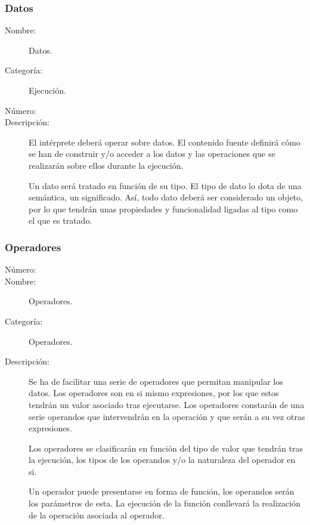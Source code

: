 \subsubsection{Datos}
\begin{framed}
	\begin{description}
		\item [Nombre:] Datos.
		\item [Categoría:] Ejecución.
		\item [Número:] \cn
		\item [Descripción:] El intérprete deberá operar sobre datos. El contenido fuente 
      definirá cómo se han de construir y/o acceder a los datos y las operaciones que se realizarán sobre ellos durante la ejecución. 
      
      Un dato será tratado en función de su tipo. El tipo de dato lo dota de una semántica, un significado.
      Así, todo dato deberá ser considerado un objeto, por lo que tendrán unas propiedades y funcionalidad ligadas al tipo como el que es tratado.
      
	\end {description}
\end{framed}

\subsubsection{Operadores}
\begin{framed}
	\begin{description}
		\item [Número:] \cn
		\item [Nombre:] Operadores.
		\item [Categoría:] Operadores.
		\item [Descripción:] Se ha de facilitar una serie de operadores que permitan manipular los datos. Los operadores
		son en si mismo expresiones, por los que estos tendrán un valor asociado tras ejecutarse. Los operadores constarán
		de una serie operandos que intervendrán en la operación y que serán a su vez otras expresiones.
		
      Los operadores se clasificarán en función del tipo de valor que tendrán tras la ejecución, los tipos de
		los operandos y/o la naturaleza del operador en si.  
      
      Un operador puede presentarse en forma de función, los operandos serán los parámetros de esta. La ejecución
      de la función conllevará la realización de la operación asociada al operador.
	\end {description}
\end{framed}
